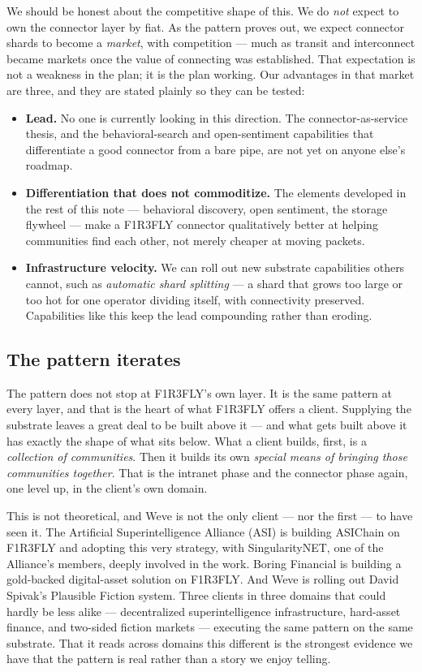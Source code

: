 \documentclass[11pt]{article}
\begin{document}
We should be honest about the competitive shape of this. We do \emph{not} expect to own the connector layer by fiat. As the pattern proves out, we expect connector shards to become a \emph{market}, with competition --- much as transit and interconnect became markets once the value of connecting was established. That expectation is not a weakness in the plan; it is the plan working. Our advantages in that market are three, and they are stated plainly so they can be tested:

\begin{itemize}[leftmargin=1.4em, itemsep=4pt]
  \item \textbf{Lead.} No one is currently looking in this direction. The connector-as-service thesis, and the behavioral-search and open-sentiment capabilities that differentiate a good connector from a bare pipe, are not yet on anyone else's roadmap.
  \item \textbf{Differentiation that does not commoditize.} The elements developed in the rest of this note --- behavioral discovery, open sentiment, the storage flywheel --- make a F1R3FLY connector qualitatively better at helping communities find each other, not merely cheaper at moving packets.
  \item \textbf{Infrastructure velocity.} We can roll out new substrate capabilities others cannot, such as \emph{automatic shard splitting} --- a shard that grows too large or too hot for one operator dividing itself, with connectivity preserved. Capabilities like this keep the lead compounding rather than eroding.
\end{itemize}

\subsection*{The pattern iterates}

The pattern does not stop at F1R3FLY's own layer. It is the same pattern at every layer, and that is the heart of what F1R3FLY offers a client. Supplying the substrate leaves a great deal to be built above it --- and what gets built above it has exactly the shape of what sits below. What a client builds, first, is a \emph{collection of communities}. Then it builds its own \emph{special means of bringing those communities together}. That is the intranet phase and the connector phase again, one level up, in the client's own domain.

This is not theoretical, and Weve is not the only client --- nor the first --- to have seen it. The Artificial Superintelligence Alliance (ASI) is building ASIChain on F1R3FLY and adopting this very strategy, with SingularityNET, one of the Alliance's members, deeply involved in the work. Boring Financial is building a gold-backed digital-asset solution on F1R3FLY. And Weve is rolling out David Spivak's Plausible Fiction system. Three clients in three domains that could hardly be less alike --- decentralized superintelligence infrastructure, hard-asset finance, and two-sided fiction markets --- executing the same pattern on the same substrate. That it reads across domains this different is the strongest evidence we have that the pattern is real rather than a story we enjoy telling.
\end{document}
